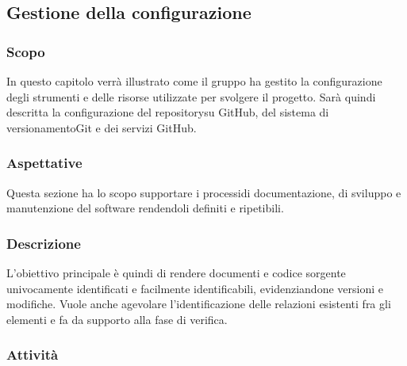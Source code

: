 \subsection{Gestione della configurazione}
	\subsubsection{Scopo}
		In questo capitolo verrà illustrato come il gruppo ha gestito la configurazione degli strumenti e delle risorse utilizzate per svolgere il progetto\glo.
		Sarà quindi descritta la configurazione del repository\glosp su GitHub, del sistema di versionamento\glosp Git e dei servizi GitHub.
	\subsubsection{Aspettative}
		Questa sezione ha lo scopo supportare i processi\glosp di documentazione, di sviluppo e manutenzione del software rendendoli definiti e ripetibili.  
	\subsubsection{Descrizione} 
		L'obiettivo principale è quindi di rendere documenti e codice sorgente univocamente identificati e facilmente identificabili, evidenziandone versioni e modifiche. Vuole anche agevolare l'identificazione delle relazioni esistenti fra gli elementi e fa da supporto alla fase di verifica.
	\subsubsection{Attività}
